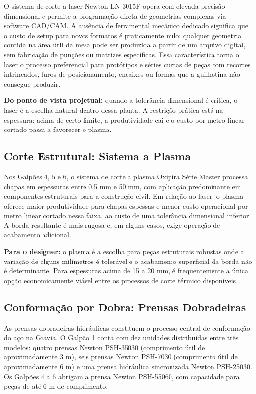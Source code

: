 \documentclass[12pt,a4paper,oneside,brazil,chapter=TITLE]{article}
\begin{document}
O sistema de corte a laser Newton LN 3015F opera com elevada precisão dimensional e permite a programação direta de geometrias complexas via software CAD/CAM. A ausência de ferramental mecânico dedicado significa que o custo de setup para novos formatos é praticamente nulo: qualquer geometria contida na área útil da mesa pode ser produzida a partir de um arquivo digital, sem fabricação de punções ou matrizes específicas. Essa característica torna o laser o processo preferencial para protótipos e séries curtas de peças com recortes intrincados, furos de posicionamento, encaixes ou formas que a guilhotina não consegue produzir.

\textbf{Do ponto de vista projetual:} quando a tolerância dimensional é crítica, o laser é a escolha natural dentro dessa planta. A restrição prática está na espessura: acima de certo limite, a produtividade cai e o custo por metro linear cortado passa a favorecer o plasma.

\subsection{Corte Estrutural: Sistema a Plasma}

Nos Galpões 4, 5 e 6, o sistema de corte a plasma Oxipira Série Master processa chapas em espessuras entre 0,5 mm e 50 mm, com aplicação predominante em componentes estruturais para a construção civil. Em relação ao laser, o plasma oferece maior produtividade para chapas espessas e menor custo operacional por metro linear cortado nessa faixa, ao custo de uma tolerância dimensional inferior. A borda resultante é mais rugosa e, em alguns casos, exige operação de acabamento adicional.

\textbf{Para o designer:} o plasma é a escolha para peças estruturais robustas onde a variação de alguns milímetros é tolerável e o acabamento superficial da borda não é determinante. Para espessuras acima de 15 a 20 mm, é frequentemente a única opção economicamente viável entre os processos de corte térmico disponíveis.

\subsection{Conformação por Dobra: Prensas Dobradeiras}

As prensas dobradeiras hidráulicas constituem o processo central de conformação do aço na Gravia. O Galpão 1 conta com dez unidades distribuídas entre três modelos: quatro prensas Newton PSH-35030 (comprimento útil de aproximadamente 3 m), seis prensas Newton PSH-7030 (comprimento útil de aproximadamente 6 m) e uma prensa hidráulica sincronizada Newton PSH-25030. Os Galpões 4 a 6 abrigam a prensa Newton PSH-55060, com capacidade para peças de até 6 m de comprimento.
\end{document}
